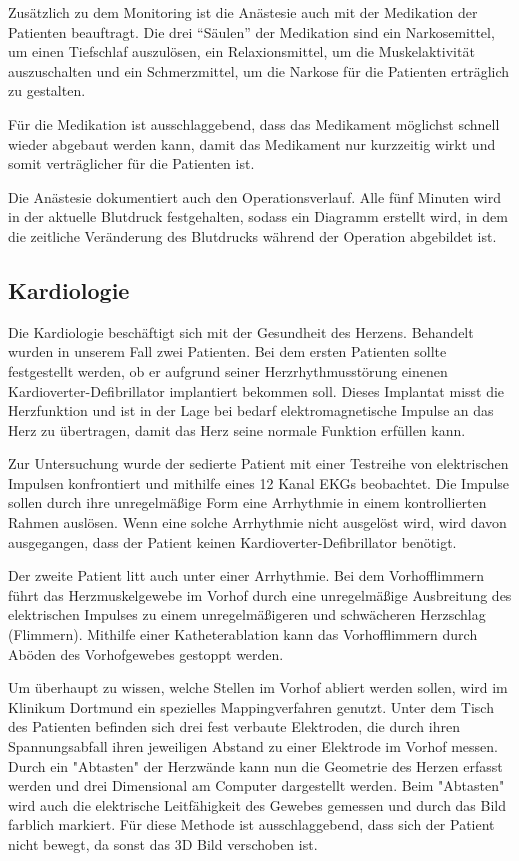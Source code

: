 \documentclass[11pt,a4paper,titlepage]{scrartcl}
\begin{document}
Zusätzlich zu dem Monitoring ist die Anästesie auch mit der Medikation der Patienten beauftragt. Die drei \enquote{Säulen} der Medikation sind ein Narkosemittel, um einen Tiefschlaf auszulösen, ein Relaxionsmittel, um die Muskelaktivität auszuschalten und ein Schmerzmittel, um die Narkose für die Patienten erträglich zu gestalten.\medskip

Für die Medikation ist ausschlaggebend, dass das Medikament möglichst schnell wieder abgebaut werden kann, damit das Medikament nur kurzzeitig wirkt und somit verträglicher für die Patienten ist. \medskip

Die Anästesie dokumentiert auch den Operationsverlauf. Alle fünf Minuten wird in der aktuelle Blutdruck festgehalten, sodass ein Diagramm erstellt wird, in dem die zeitliche Veränderung des Blutdrucks während der Operation abgebildet ist. 




\subsection{Kardiologie}

Die Kardiologie beschäftigt sich mit der Gesundheit des Herzens. Behandelt wurden in unserem Fall zwei Patienten. Bei dem ersten Patienten sollte festgestellt werden, ob er aufgrund seiner Herzrhythmusstörung einenen Kardioverter-Defibrillator implantiert bekommen soll. Dieses Implantat misst die Herzfunktion und ist in der Lage bei bedarf elektromagnetische Impulse an das Herz zu übertragen, damit das Herz seine normale Funktion erfüllen kann. \medskip

Zur Untersuchung wurde der sedierte Patient mit einer Testreihe von elektrischen Impulsen konfrontiert und mithilfe eines 12 Kanal EKGs beobachtet. Die Impulse sollen durch ihre unregelmäßige Form eine Arrhythmie in einem kontrollierten Rahmen auslösen. Wenn eine solche Arrhythmie nicht ausgelöst wird, wird davon ausgegangen, dass der Patient keinen Kardioverter-Defibrillator benötigt. \medskip

Der zweite Patient litt auch unter einer Arrhythmie. Bei dem Vorhofflimmern führt das Herzmuskelgewebe im Vorhof durch eine unregelmäßige Ausbreitung des elektrischen Impulses zu einem unregelmäßigeren und schwächeren Herzschlag (Flimmern). Mithilfe einer Katheterablation kann das Vorhofflimmern durch Aböden des Vorhofgewebes gestoppt werden. \medskip

Um überhaupt zu wissen, welche Stellen im Vorhof abliert werden sollen, wird im Klinikum Dortmund ein spezielles Mappingverfahren genutzt. Unter dem Tisch des Patienten befinden sich drei fest verbaute Elektroden, die durch ihren Spannungsabfall ihren jeweiligen Abstand zu einer Elektrode im Vorhof messen. Durch ein "Abtasten" der Herzwände kann nun die Geometrie des Herzen erfasst werden und drei Dimensional am Computer dargestellt werden. Beim "Abtasten" wird auch die elektrische Leitfähigkeit des Gewebes gemessen und durch das Bild farblich markiert. Für diese Methode ist ausschlaggebend, dass sich der Patient nicht bewegt, da sonst das 3D Bild verschoben ist. \medskip
\end{document}
